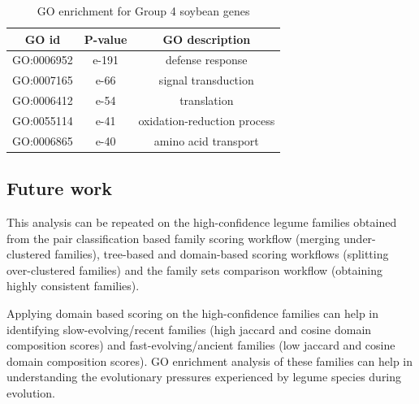\documentclass{article}
\begin{document}
		\begin{table}[h!]
			\centering
			\begin{tabular}{|c |c |c |} 
				\hline
				GO id & P-value & GO description \\
				\hline\hline
				GO:0006952 & e-191 & defense response \\ 
				\hline
				GO:0007165 & e-66 & signal transduction \\
				\hline
				GO:0006412 & e-54 & translation \\
				\hline
				GO:0055114 & e-41 & oxidation-reduction process \\
				\hline
				GO:0006865 & e-40 & amino acid transport \\ 
				\hline
			\end{tabular}
			\caption{GO enrichment for Group 4 soybean genes}
			\label{tab:gotable_group4}
		\end{table}
		
		\subsection{Future work}
		This analysis can be repeated on the high-confidence legume families obtained from the pair classification based family scoring workflow (merging under-clustered families), tree-based and domain-based scoring workflows (splitting over-clustered families) and the family sets comparison workflow (obtaining highly consistent families). 
		
		Applying domain based scoring on the high-confidence families can help in identifying slow-evolving/recent families (high jaccard and cosine domain composition scores) and fast-evolving/ancient families (low jaccard and cosine domain composition scores). GO enrichment analysis of these families can help in understanding the evolutionary pressures experienced by legume species during evolution. 
		
		\pagebreak
\end{document}
